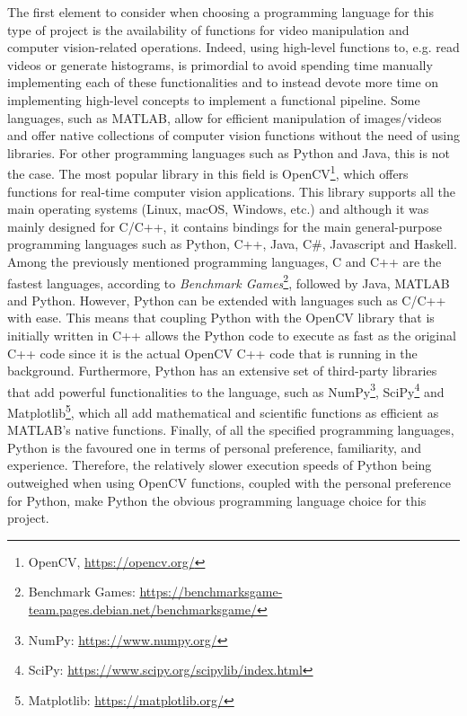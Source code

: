 The first element to consider when choosing a programming language for this type of project is the availability of functions for video manipulation and computer vision-related operations. Indeed, using high-level functions to, e.g. read videos or generate histograms, is primordial to avoid spending time manually implementing each of these functionalities and to instead devote more time on implementing high-level concepts to implement a functional pipeline. Some languages, such as MATLAB, allow for efficient manipulation of images/videos and offer native collections of computer vision functions without the need of using libraries. For other programming languages such as Python and Java, this is not the case. The most popular library in this field is OpenCV\footnote{OpenCV, \url{https://opencv.org/}}, which offers functions for real-time computer vision applications. This library supports all the main operating systems (Linux, macOS, Windows, etc.) and although it was mainly designed for C/C++, it contains bindings for the main general-purpose programming languages such as Python, C++, Java, C\#, Javascript and Haskell.\\

Among the previously mentioned programming languages, C and C++ are the fastest languages,
according to \textit{Benchmark Games}\footnote{Benchmark Games: \url{https://benchmarksgame-team.pages.debian.net/benchmarksgame/}}, followed by Java, MATLAB and Python. However, Python can be extended with languages such as C/C++ with ease. This means that coupling Python with the OpenCV library that is initially written in C++ allows the Python code to execute as fast as the original C++ code since it is the actual OpenCV C++ code that is running in the background. Furthermore, Python has an extensive set of third-party libraries that add powerful functionalities to the language, such as NumPy\footnote{NumPy: \url{https://www.numpy.org/}}, SciPy\footnote{SciPy: \url{https://www.scipy.org/scipylib/index.html}} and Matplotlib\footnote{Matplotlib: \url{https://matplotlib.org/}}, which all add mathematical and scientific functions as efficient as MATLAB's native functions. Finally, of all the specified programming languages, Python is the favoured one in terms of personal preference, familiarity, and experience. Therefore, the relatively slower execution speeds of Python being outweighed when using OpenCV functions, coupled with the personal preference for Python, make Python the obvious programming language choice for this project.\\

